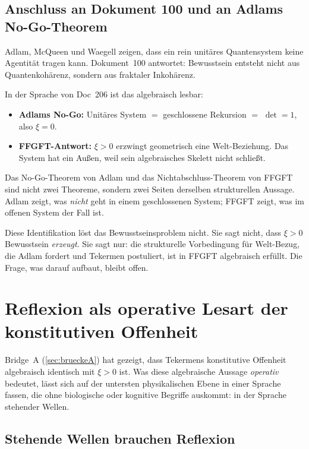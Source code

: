 \subsection{Anschluss an Dokument 100 und an Adlams No-Go-Theorem}

Adlam, McQueen und Waegell zeigen, dass ein rein unitäres Quantensystem keine Agentität tragen kann. Dokument~100 antwortet: Bewusstsein entsteht nicht aus Quantenkohärenz, sondern aus fraktaler Inkohärenz.

In der Sprache von Doc~206 ist das algebraisch lesbar:

\begin{itemize}
\item \textbf{Adlams No-Go:} Unitäres System $=$ geschlossene Rekursion $=$ $\det = 1$, also $\xi = 0$.
\item \textbf{FFGFT-Antwort:} $\xi > 0$ erzwingt geometrisch eine Welt-Beziehung. Das System hat ein Außen, weil sein algebraisches Skelett nicht schließt.
\end{itemize}

Das No-Go-Theorem von Adlam und das Nichtabschluss-Theorem von FFGFT sind nicht zwei Theoreme, sondern zwei Seiten derselben strukturellen Aussage. Adlam zeigt, was \emph{nicht} geht in einem geschlossenen System; FFGFT zeigt, was im offenen System der Fall ist.

\begin{interpretation}
Diese Identifikation löst das Bewusstseinsproblem nicht. Sie sagt nicht, dass $\xi > 0$ Bewusstsein \emph{erzeugt}. Sie sagt nur: die strukturelle Vorbedingung für Welt-Bezug, die Adlam fordert und Tekermen postuliert, ist in FFGFT algebraisch erfüllt. Die Frage, was darauf aufbaut, bleibt offen.
\end{interpretation}

\section{Reflexion als operative Lesart der konstitutiven Offenheit}\label{sec:reflexion}

Bridge~A (\ref{sec:brueckeA}) hat gezeigt, dass Tekermens konstitutive Offenheit algebraisch identisch mit $\xi > 0$ ist. Was diese algebraische Aussage \emph{operativ} bedeutet, lässt sich auf der untersten physikalischen Ebene in einer Sprache fassen, die ohne biologische oder kognitive Begriffe auskommt: in der Sprache stehender Wellen.

\subsection{Stehende Wellen brauchen Reflexion}\label{sec:reflexion_stehend}

